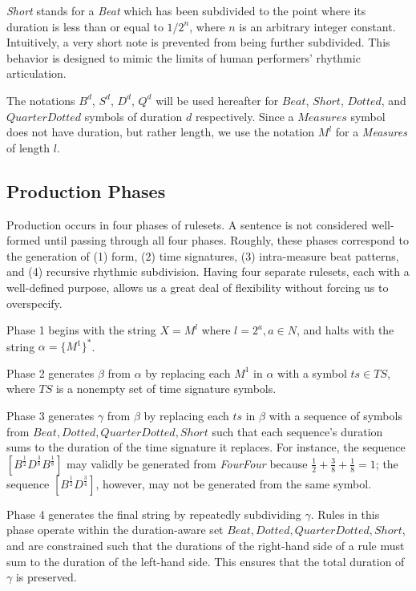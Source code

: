 \documentclass{article}
\begin{document}
\emph{Short} stands for a \emph{Beat} which has been subdivided to the point where its duration is less than or equal to $1/2^n$, where $n$ is an arbitrary integer constant. Intuitively, a very short note is prevented from being further subdivided. This behavior is designed to mimic the limits of human performers’ rhythmic articulation.

The notations $B^d$, $S^d$, $D^d$, $Q^d$ will be used hereafter for $Beat$, $Short$, $Dotted$, and $QuarterDotted$ symbols of duration $d$ respectively. Since a $Measures$ symbol does not have duration, but rather length, we use the notation $M^l$ for a \emph{Measures} of length $l$.

\subsection{Production Phases}


Production occurs in four phases of rulesets. A sentence is not considered well-formed until passing through all four phases. Roughly, these phases correspond to the generation of (1) form, (2) time signatures, (3) intra-measure beat patterns, and (4) recursive rhythmic subdivision. Having four separate rulesets, each with a well-defined purpose, allows us a great deal of flexibility without forcing us to overspecify. 

Phase 1 begins with the string $X = M^l$ where $l=2^a, a \in N$, and halts with the string $\alpha = \{ M^1 \}^*$.

Phase 2 generates $\beta$ from $\alpha$ by replacing each $M^1$ in $\alpha$ with a symbol $ts \in TS$, where $TS$ is a nonempty set of time signature symbols.

Phase 3 generates $\gamma$ from $\beta$ by replacing each $ts$ in $\beta$ with a sequence of symbols from ${Beat, Dotted, QuarterDotted, Short}$ such that each sequence's duration sums to the duration of the time signature it replaces. For instance, the sequence $[B^\frac{1}{2} D^\frac{3}{8} B^\frac{1}{8}]$ may validly be generated from \emph{FourFour} because $\frac{1}{2} + \frac{3}{8} + \frac{1}{8} = 1$; the sequence $[B^\frac{1}{2} D^\frac{3}{4}]$, however, may not be generated from the same symbol.

Phase 4 generates the final string by repeatedly subdividing $\gamma$. Rules in this phase operate within the duration-aware set ${Beat, Dotted, QuarterDotted, Short}$, and are constrained such that the durations of the right-hand side of a rule must sum to the duration of the left-hand side. This ensures that the total duration of $\gamma$ is preserved.
\end{document}

